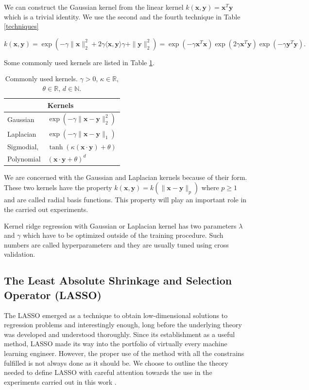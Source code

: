 \documentclass[11pt,oneside,czech,american]{book} %
\theoremstyle{plain}
\theoremstyle{definition}
\begin{document}
We can construct the Gaussian kernel from the linear kernel $k(\bm{x}, \bm{y}) = \bm{x}^T \bm{y}$ which is a trivial identity. We use the second and the fourth technique in Table \ref{techniques}

\begin{equation}
	k(\bm{x}, \bm{y})= \exp(-\gamma \|\bm{x} \|^2_2 + 2\gamma \langle \bm{x}, \bm{y} \rangle \gamma + \|\bm{y} \|^2_2) = \exp(-\gamma \bm{x}^T \bm{x})  \exp(2\gamma  \bm{x}^T \bm{y})  \exp(-\gamma \bm{y}^T \bm{y}).
\end{equation}

Some commonly used kernels are listed in Table \ref{kernely}.

\begin{table}[H]
	\centering
	\begin{tabular}{ll} 
		\hline
		& Kernels  \\ 
		\hline
		Gaussian & $ \exp(-\gamma \|\bm{x}-\bm{y} \|^2_2)$   \\
		Laplacian & $ \exp(-\gamma \|\bm{x}-\bm{y} \|_1)$   \\
		Sigmodial, & $\tanh(\kappa (\bm{x} \cdot \bm{y}) + \theta)$   \\
		Polynomial & $(\bm{x} \cdot \bm{y} + \theta)^d$ \\
		\hline
	\end{tabular}
	\caption{Commonly used kernels. $\gamma > 0$, $\kappa \in \mathbb{R}$, $\theta \in \mathbb{R}$, $d \in \mathbb{N}$.}
	\label{kernely}
\end{table}

We are concerned with the Gaussian and Laplacian kernels because of their form. These two kernels have the property $k(\bm{x}, \bm{y}) = k(\| \bm{x}-\bm{y} \|_p)$ where $p\geq1$ and are called radial basis functions. This property will play an important role in the carried out experiments.

Kernel ridge regression with Gaussian or Laplacian kernel has two parameters $\lambda$ and $\gamma$ which have to be optimized outside of the training procedure. Such numbers are called hyperparameters and they are usually tuned using cross validation.


\subsection{The Least Absolute Shrinkage and Selection Operator (LASSO)}
The LASSO emerged as a technique to obtain low-dimensional solutions to regression problems and interestingly enough, long before the underlying theory was developed and understood thoroughly. Since its establishment as a useful method, LASSO made its way into the portfolio of virtually every machine learning engineer. However, the proper use of the method with all the constrains fulfilled is not always done as it should be. We choose to outline the theory needed to define LASSO with careful attention towards the use in the experiments carried out in this work \parencite{boche15}.
\end{document}
